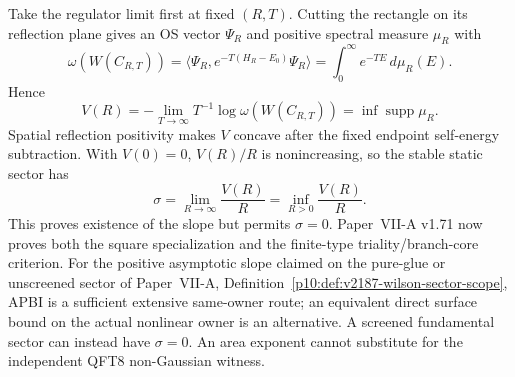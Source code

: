 \documentclass[12pt,a4paper]{article}
\begin{document}
\begin{theorem}
\label{p12:thm:v164-ordered-static-tension-limits}
Take the regulator limit first at fixed \((R,T)\).  Cutting the rectangle on
its reflection plane gives an OS vector \(\Psi_R\) and positive spectral
measure \(\mu_R\) with
\[
 \omega(W(C_{R,T}))
 =\langle\Psi_R,e^{-T(H_R-E_0)}\Psi_R\rangle
 =\int_0^\infty e^{-TE}\,d\mu_R(E).
\]
Hence
\[
 V(R)=-\lim_{T\to\infty}T^{-1}\log\omega(W(C_{R,T}))
 =\inf\operatorname{supp}\mu_R.
\]
Spatial reflection positivity makes \(V\) concave after the fixed endpoint
self-energy subtraction.  With \(V(0)=0\), \(V(R)/R\) is nonincreasing, so
the stable static sector has
\[
 \boxed{
 \sigma=\lim_{R\to\infty}\frac{V(R)}R
 =\inf_{R>0}\frac{V(R)}R.}
\]
This proves existence of the slope but permits \(\sigma=0\).  Paper~VII-A
v1.71 now proves both the square specialization and the finite-type
triality/branch-core criterion.  For the positive asymptotic slope claimed on
the pure-glue or unscreened sector of Paper~VII-A,
Definition~\ref{p10:def:v2187-wilson-sector-scope}, APBI is a sufficient
extensive same-owner route; an equivalent direct surface bound on the actual
nonlinear owner is an alternative.  A screened fundamental sector can instead
have \(\sigma=0\).  An area exponent cannot substitute for the independent
QFT8 non-Gaussian witness.
\end{theorem}
\end{document}
